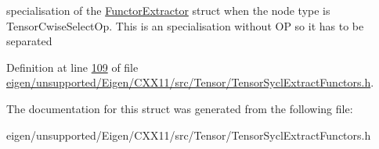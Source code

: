 specialisation of the \hyperlink{struct_eigen_1_1_tensor_sycl_1_1internal_1_1_functor_extractor}{Functor\+Extractor} struct when the node type is Tensor\+Cwise\+Select\+Op. This is an specialisation without OP so it has to be separated 

Definition at line \hyperlink{eigen_2unsupported_2_eigen_2_c_x_x11_2src_2_tensor_2_tensor_sycl_extract_functors_8h_source_l00109}{109} of file \hyperlink{eigen_2unsupported_2_eigen_2_c_x_x11_2src_2_tensor_2_tensor_sycl_extract_functors_8h_source}{eigen/unsupported/\+Eigen/\+C\+X\+X11/src/\+Tensor/\+Tensor\+Sycl\+Extract\+Functors.\+h}.



The documentation for this struct was generated from the following file\+:\begin{DoxyCompactItemize}
\item 
eigen/unsupported/\+Eigen/\+C\+X\+X11/src/\+Tensor/\+Tensor\+Sycl\+Extract\+Functors.\+h\end{DoxyCompactItemize}
